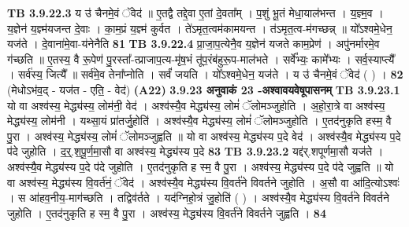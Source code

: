 \documentclass[17pt]{extarticle}
\begin{document}
{{{{{{{{{{{{{{{{{{{{{{                  \newline
                                \textbf{ TB 3.9.22.3} \newline
                  य उ॑ चैनमे॒वं ॅवेद॑ ॥ ए॒तद्वै तद्दे॒वा ए॒तां दे॒वता᳚म् । प॒शुं भू॒तं मेधा॒याल॑भन्त । य॒ज्ञ्म॒व । य॒ज्ञेन॑ य॒ज्ञ्म॑यजन्त दे॒वाः । का॒म॒प्रं य॒ज्ञ्म॑ कुर्वत । ते॑ऽमृत॒त्वम॑कामयन्त । त॑ऽमृत॒त्व-म॑गच्छन्न् ॥ यो᳚ऽश्वमे॒धेन॒ यज॑ते । दे॒वाना॑मे॒वा-य॑नेनैति \textbf{ 81} \newline
                  \newline
                                \textbf{ TB 3.9.22.4} \newline
                  प्रा॒जा॒प॒त्येनै॒व य॒ज्ञेन॑ यजते काम॒प्रेण॑ । अपु॑नर्मारमे॒व ग॑च्छति ॥ ए॒तस्य॒ वै रू॒पेण॑ पु॒रस्ता᳚-त्प्राजाप॒त्य-मृ॑ष॒भं तू॑प॒रंब॑हुरू॒प-माल॑भते । सर्वे᳚भ्यः॒ कामे᳚भ्यः । सर्व॒स्याप्त्यै᳚ । सर्व॑स्य॒ जित्यै᳚ ॥ सर्व॑मे॒व तेना᳚प्नोति । सर्वं॑ जयति । यो᳚ऽश्वमे॒धेन॒ यज॑ते । य उ॑ चैनमे॒वं ॅवेद॑ ( ) । \textbf{ 82} \newline
                  \newline
                                    (मेधोऽभ॑व॒द् - यज॑त - एति॒ - वेद॑) \textbf{(A22)} \newline \newline
                \textbf{ 3.9.23    अनुवाकं   23 -अश्वावयवेषूपासनम्} \newline
                                \textbf{ TB 3.9.23.1} \newline
                  यो वा अश्व॑स्य॒ मेद्ध्य॑स्य॒ लोम॑नी॒ वेद॑ । अश्व॑स्यै॒व मेद्ध्य॑स्य॒ लोमं॑ ॅलोमञ्जुहोति । अ॒हो॒रा॒त्रे वा अश्व॑स्य॒ मेद्ध्य॑स्य॒ लोम॑नी । यथ्सा॒यं प्रा॑तर्जु॒होति॑ । अश्व॑स्यै॒व मेद्ध्य॑स्य॒ लोमं॑ ॅलोमञ्जुहोति । ए॒तद॑नुकृति हस्म॒ वै पु॒रा । अश्व॑स्य॒ मेद्ध्य॑स्य॒ लोमं॑ ॅलोमञ्जुह्वति ॥ यो वा अश्व॑स्य॒ मेद्ध्य॑स्य प॒दे वेद॑ । अश्व॑स्यै॒व मेद्ध्य॑स्य प॒दे प॑दे जुहोति । द॒र्॒.श॒पू॒र्ण॒मा॒सौ वा अश्व॑स्य॒ मेद्ध्य॑स्य प॒दे \textbf{ 83} \newline
                  \newline
                                \textbf{ TB 3.9.23.2} \newline
                  यद्द॑र्.शपूर्णमा॒सौ यज॑ते । अश्व॑स्यै॒व मेद्ध्य॑स्य प॒दे प॑दे जुहोति । ए॒तद॑नुकृति ह स्म॒ वै पु॒रा । अश्व॑स्य॒ मेद्ध्य॑स्य प॒दे प॑दे जुह्वति ॥ यो वा अश्व॑स्य॒ मेद्ध्य॑स्य वि॒वर्त॑नं॒ ॅवेद॑ । अश्व॑स्यै॒व मेद्ध्य॑स्य वि॒वर्त॑ने विवर्तने जुहोति । अ॒सौ वा आ॑दि॒त्योऽश्वः॑ । स आ॑हव॒नीय॒-माग॑च्छति । तद्विव॑र्तते । यद॑ग्निहो॒त्रं जु॒होति॑ ( ) । अश्व॑स्यै॒व मेद्ध्य॑स्य वि॒वर्त॑ने विवर्तने जुहोति । ए॒तद॑नुकृति ह स्म॒ वै पु॒रा । अश्व॑स्य॒ मेद्ध्य॑स्य वि॒वर्त॑ने विवर्तने जुह्वति । \textbf{ 84} \newline
}}}}}}}}}}}}}}}}}}}}}}
\end{document}
